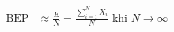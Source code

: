 \documentclass[preview]{standalone}
\begin{document}
\begin{align*}
\text{BEP} &\approx \frac{E}{N} = \frac{\sum_{i = 1}^{N}X_i}{N} \text{ khi } N \to \infty
\end{align*}
\end{document}
